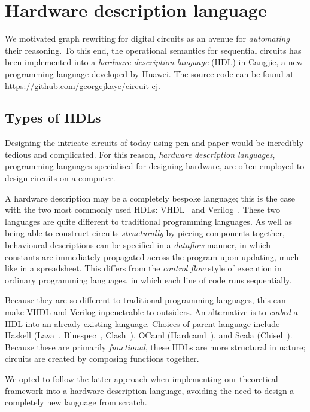 \section{Hardware description language}\label{sec:hdl}

We motivated graph rewriting for digital circuits as an avenue for
\emph{automating} their reasoning.
To this end, the operational semantics for sequential circuits has been
implemented into a \emph{hardware description language} (HDL) in Cangjie, a new
programming language developed by Huawei.
The source code can be found at \url{https://github.com/georgejkaye/circuit-cj}.

\subsection{Types of HDLs}

Designing the intricate circuits of today using pen and paper would be
incredibly tedious and complicated.
For this reason, \emph{hardware description languages}, programming languages
specialised for designing hardware, are often employed to design circuits on a
computer.

A hardware description may be a completely bespoke language; this is the case
with the two most commonly used HDLs: VHDL~\cite{ieeecomputersociety1988ieee}
and Verilog~\cite{ieeecomputersociety1996ieee}.
These two languages are quite different to traditional programming languages.
As well as being able to construct circuits \emph{structurally} by piecing
components together, behavioural descriptions
can be specified in a \emph{dataflow} manner, in which constants are immediately
propagated across the program upon updating, much like in a spreadsheet.
This differs from the \emph{control flow} style of execution in ordinary
programming languages, in which each line of code runs sequentially.

Because they are so different to traditional programming languages, this can
make VHDL and Verilog inpenetrable to outsiders.
An alternative is to \emph{embed} a HDL into an already existing language.
Choices of parent language include Haskell (Lava~\cite{bjesse1998lava},
Bluespec~\cite{nikhil2004bluespec},
Clash~\cite{kooijman2009haskell,baaij2010clash}), OCaml
(Hardcaml~\cite{ray2023hardcaml}), and Scala (Chisel~\cite{bachrach2012chisel}).
Because these are primarily \emph{functional}, these HDLs are more structural in
nature; circuits are created by composing functions together.

We opted to follow the latter approach when implementing our theoretical
framework into a hardware description language, avoiding the need to design a
completely new language from scratch.

